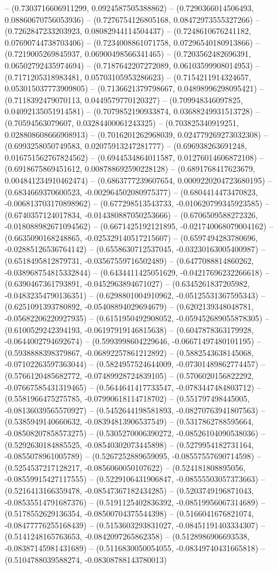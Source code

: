 -- (0.7303716606911299, 0.0924587505388862) -- (0.7290366014506493, 0.08860670756053936) -- (0.7276754126805168, 0.08472973555327266) -- (0.7262847233203923, 0.08082944114504437) -- (0.7248610676241182, 0.07690744738703406) -- (0.7234008861071758, 0.07296540180913866) -- (0.7219005269845937, 0.06900498566341465) -- (0.7203562482696391, 0.06502792435974694) -- (0.7187642207272089, 0.06103599908014953) -- (0.7171205318983481, 0.05703105953286623) -- (0.7154211914324657, 0.053015037773909805) -- (0.7136621379798667, 0.04898996298095421) -- (0.7118392479070113, 0.0449579770120327) -- (0.709948346097825, 0.04092135051914581) -- (0.7079852190933874, 0.03688249931513728) -- (0.70594563079607, 0.03284400061243325) -- (0.703825340919251, 0.028808608666908913) -- (0.7016201262968039, 0.024779269273032308) -- (0.6993258050749583, 0.02075913247281777) -- (0.696938263691248, 0.016751562767824562) -- (0.6944534864011587, 0.01276014606872108) -- (0.6918675869451612, 0.008788692590228128) -- (0.6891768417623679, 0.004841234910462474) -- (0.6863777239607654, 0.0009220204723680195) -- (0.6834669370600523, -0.002964502080975377) -- (0.6804414473470823, -0.006813703170898962) -- (0.677298513543733, -0.010620799345923585) -- (0.6740357124017834, -0.014380887050253666) -- (0.6706509588272326, -0.018088982671094562) -- (0.6671425192121895, -0.021740068079004162) -- (0.6635090168248865, -0.025329140517215607) -- (0.6597494283780696, -0.02885126536764142) -- (0.6558630712537045, -0.03230163005400987) -- (0.6518495812879731, -0.03567559716502489) -- (0.6477088814860262, -0.038968754815332844) -- (0.6434411425051629, -0.04217696232266618) -- (0.6390467361793891, -0.0452963894671027) -- (0.6345261837205982, -0.04832354790136351) -- (0.6298801004910962, -0.05125531367595343) -- (0.6251091393780892, -0.05408894029694679) -- (0.6202139348048781, -0.05682206220927935) -- (0.6151950492908052, -0.059452689055878305) -- (0.6100529242394193, -0.06197919146815638) -- (0.6047878363179928, -0.0644002794692674) -- (0.5993998604229646, -0.06671497480101195) -- (0.5938888398379867, -0.06892257861212892) -- (0.5882543638145068, -0.07102263597363044) -- (0.5824957524644009, -0.07301489862774457) -- (0.5766120485682772, -0.07489928724839105) -- (0.5706020156822292, -0.07667585431319465) -- (0.5644641417733547, -0.0783447484803712) -- (0.5581966475275785, -0.07990618114718702) -- (0.551797498445005, -0.08136039565570927) -- (0.5452644198581893, -0.08270763941807563) -- (0.5385949140660632, -0.08394813906537549) -- (0.5317862788595664, -0.08508207858573275) -- (0.5305270006390272, -0.08526104090538036) -- (0.5292630184885525, -0.08540302073445898) -- (0.5279954182731164, -0.0855078961005789) -- (0.5267252889659095, -0.08557557690714598) -- (0.5254537217128217, -0.0856060050107622) -- (0.524181808895056, -0.08559915427117555) -- (0.5229106431906847, -0.08555503057373663) -- (0.5216413166359478, -0.08547367182434285) -- (0.5203749196871043, -0.08535514791687376) -- (0.5191125402836392, -0.08519956067314689) -- (0.5178552629136354, -0.08500704375544398) -- (0.5166041676821074, -0.08477776255168439) -- (0.5153603293831027, -0.08451191403334307) -- (0.5141248165763653, -0.0842097265862358) -- (0.5128986906693538, -0.08387145981431689) -- (0.5116830050054055, -0.08349740431665818) -- (0.5104788039588274, -0.08308788143780013) 